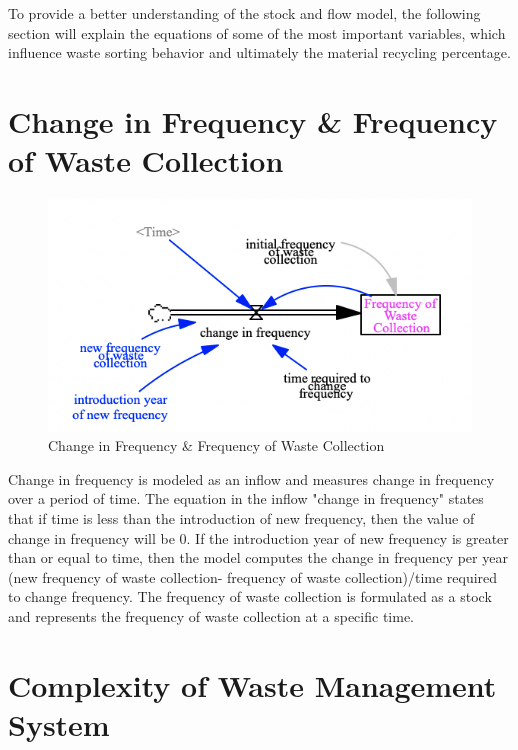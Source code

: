 To provide a better understanding of the stock and flow model, the following section will explain the equations of some of the most important variables, which influence waste sorting behavior and ultimately the material recycling percentage. 

\section{Change in Frequency \& Frequency of Waste Collection}

\begin{figure}[H]
\centering
\includegraphics [scale=0.34,angle=360]{figures/frequency.png}
\caption{Change in Frequency \& Frequency of Waste Collection}
\label{fig:frequency}
\end{figure}	

\indent \newline
Change in frequency is modeled as an inflow and measures change in frequency over a period of time. The equation in the inflow "change in frequency" states that if time is less than the introduction of new frequency, then the value of change in frequency will be 0. If the introduction year of new frequency is greater than or equal to time, then the model computes the change in frequency per year (new frequency of waste collection- frequency of waste collection)/time required to change frequency. The frequency of waste collection is formulated as a stock and represents the frequency of waste collection at a specific time. 

\section{Complexity of Waste Management System}


